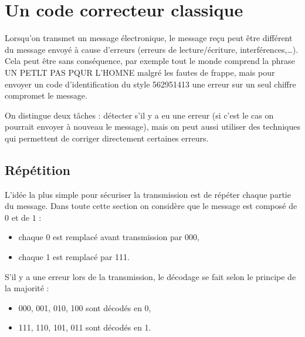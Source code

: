 \documentclass[11pt,class=report,crop=false]{standalone}
\begin{document}





\section{Un code correcteur classique}

Lorsqu'on transmet un message électronique, le message reçu peut être différent du message envoyé à cause d'erreurs (erreurs de lecture/écriture, interférences,\ldots). Cela peut être sans conséquence, par exemple tout le monde comprend la phrase \og{}UN PETLT PAS PQUR L'HOMNE\fg{} malgré les fautes de frappe, mais pour envoyer un code d'identification du style \og{}562951413\fg{} une erreur sur un seul chiffre compromet le message.

On distingue deux tâches : détecter s'il y a eu une erreur (si c'est le cas on pourrait envoyer à nouveau le message), mais on peut aussi utiliser des techniques qui permettent de corriger directement certaines erreurs.

\subsection{Répétition}

L'idée la plus simple pour sécuriser la transmission est de répéter chaque partie du message.
Dans toute cette section on considère que le message est composé de $0$ et de $1$ :
\begin{itemize}
  \item chaque \og{}0\fg{} est remplacé avant transmission par \og{}000\fg{},
  \item chaque \og{}1\fg{} est remplacé par \og{}111\fg{}.
\end{itemize}

S'il y a une erreur lors de la transmission, le décodage se fait selon le principe de la majorité :
\begin{itemize}
  \item 000, 001, 010, 100 sont décodés en \og{}0\fg{},
  \item 111, 110, 101, 011 sont décodés en \og{}1\fg{}.
\end{itemize}
\end{document}
